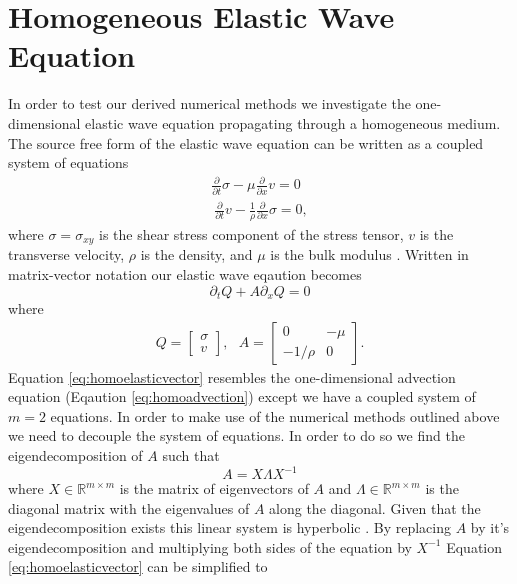 \documentclass[review,onefignum,onetabnum]{siamart171218}
\begin{document}
\section{Homogeneous Elastic Wave Equation}
In order to test our derived numerical methods we investigate the one-dimensional elastic wave equation propagating through a homogeneous medium. The source free form of the elastic wave equation can be written as a coupled system of equations
\begin{equation}
\begin{gathered}
    \frac{\partial}{\partial t}\sigma - \mu \frac{\partial}{\partial x} v = 0 \label{eq:elastic}\\
    \ \frac{\partial}{\partial t}v - \frac{1}{\rho} \frac{\partial}{\partial x} \sigma = 0, 
\end{gathered}
\end{equation}
where $\sigma = \sigma_{xy}$ is the shear stress component of the stress tensor, $v$ is the transverse velocity, $\rho$ is the density, and $\mu$ is the bulk modulus \cite{comp_seis}. Written in matrix-vector notation our elastic wave eqaution becomes
\begin{equation}
    \partial_t Q + A \partial_x Q = 0
    \label{eq:homoelasticvector}
\end{equation}
where 
\begin{align*}
    Q = \begin{bmatrix} \sigma \\ v\end{bmatrix}, \:\:\:  A = \begin{bmatrix} 0 & -\mu\\ -1/\rho & 0\end{bmatrix}.
\end{align*}
Equation \ref{eq:homoelasticvector} resembles the one-dimensional advection equation (Eqaution \ref{eq:homoadvection}) except we have a coupled system of $m=2$ equations. In order to make use of the numerical methods outlined above we need to decouple the system of equations. In order to do so we find the eigendecomposition of $A$ such that
\begin{equation}
    A = X\Lambda X^{-1}
\end{equation}
where $X \in \mathbb{R}^{m\times m}$ is the matrix of eigenvectors of $A$ and $\Lambda  \in \mathbb{R}^{m\times m}$ is the diagonal matrix with the eigenvalues of $A$ along the diagonal. Given that the eigendecomposition exists this linear system is hyperbolic \cite{leveque_2002}. By replacing $A$ by it's eigendecomposition and multiplying both sides of the equation by $X^{-1}$ Equation \ref{eq:homoelasticvector} can be simplified to 
\end{document}
